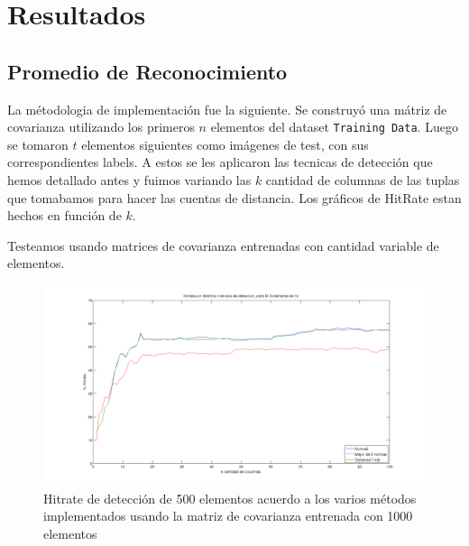 \section{Resultados}


\subsection{Promedio de Reconocimiento}
La m\'etodologia de implementaci\'on fue la siguiente. Se construy\'o una m\'atriz de covarianza utilizando los
primeros $n$ elementos del dataset \texttt{Training Data}. Luego se tomaron $t$ elementos siguientes como
im\'agenes de test, con sus correspondientes labels. A estos se les aplicaron las tecnicas de detecci\'on
que hemos detallado antes y fuimos variando las $k$ cantidad de columnas de las tuplas que tomabamos para
hacer las cuentas de distancia. Los gr\'aficos de HitRate estan hechos en funci\'on de $k$.

Testeamos usando matrices de covarianza entrenadas con cantidad variable de elementos.
\def \hrwidth {500pt}

\begin{figure}[H]
\begin {center}
\includegraphics[width=\hrwidth]{plots/hitrate-1kcv.png}
\end {center}
\caption{Hitrate de detecci\'on de 500 elementos acuerdo a los varios m\'etodos implementados
usando la matriz de covarianza entrenada con 1000 elementos}
\label{fig:HR1kcv}
\end{figure}

